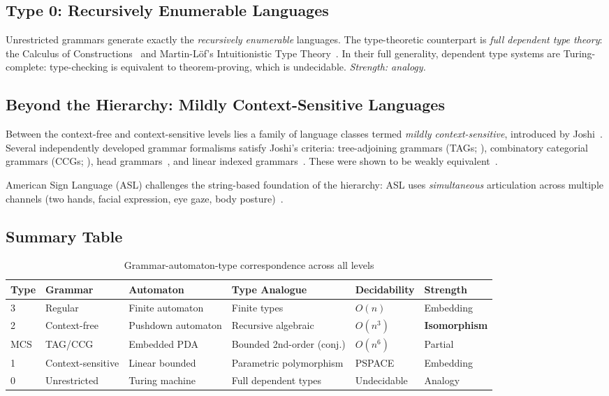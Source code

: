 \documentclass[12pt,a4paper]{article}
\begin{document}
\subsection{Type 0: Recursively Enumerable Languages}

Unrestricted grammars generate exactly the \emph{recursively enumerable}
languages. The type-theoretic counterpart is \emph{full dependent type
theory}: the Calculus of Constructions~\cite{CoquandHuet1988} and
Martin-L\"{o}f's Intuitionistic Type Theory~\cite{MartinLof1975,MartinLof1984}.
In their full generality, dependent type systems are Turing-complete:
type-checking is equivalent to theorem-proving, which is undecidable.
\emph{Strength: analogy.}

\subsection{Beyond the Hierarchy: Mildly Context-Sensitive Languages}

Between the context-free and context-sensitive levels lies a family of language
classes termed \emph{mildly context-sensitive}, introduced by
Joshi~\cite{Joshi1985}. Several independently developed grammar formalisms
satisfy Joshi's criteria: tree-adjoining grammars (TAGs;
\cite{JoshiLevyTakahashi1975}), combinatory categorial grammars
(CCGs; \cite{Steedman2000}), head grammars~\cite{Pollard1984}, and linear
indexed grammars~\cite{Gazdar1988}. These were shown to be weakly
equivalent~\cite{VijayShankerWeir1994}.

American Sign Language (ASL) challenges the string-based foundation of the
hierarchy: ASL uses \emph{simultaneous} articulation across multiple channels
(two hands, facial expression, eye gaze, body
posture)~\cite{SandlerLilloMartin2006}.

\subsection{Summary Table}

\begin{table}[ht]
\centering
\caption{Grammar-automaton-type correspondence across all levels}
\label{tab:hierarchy}
\small
\begin{tabular}{@{}llllll@{}}
\toprule
Type & Grammar & Automaton & Type Analogue & Decidability & Strength \\
\midrule
3 & Regular & Finite automaton & Finite types & $O(n)$ & Embedding \\
2 & Context-free & Pushdown automaton & Recursive algebraic & $O(n^3)$ & \textbf{Isomorphism} \\
MCS & TAG/CCG & Embedded PDA & Bounded 2nd-order (conj.) & $O(n^6)$ & Partial \\
1 & Context-sensitive & Linear bounded & Parametric polymorphism & PSPACE & Embedding \\
0 & Unrestricted & Turing machine & Full dependent types & Undecidable & Analogy \\
\bottomrule
\end{tabular}
\end{table}
\end{document}
